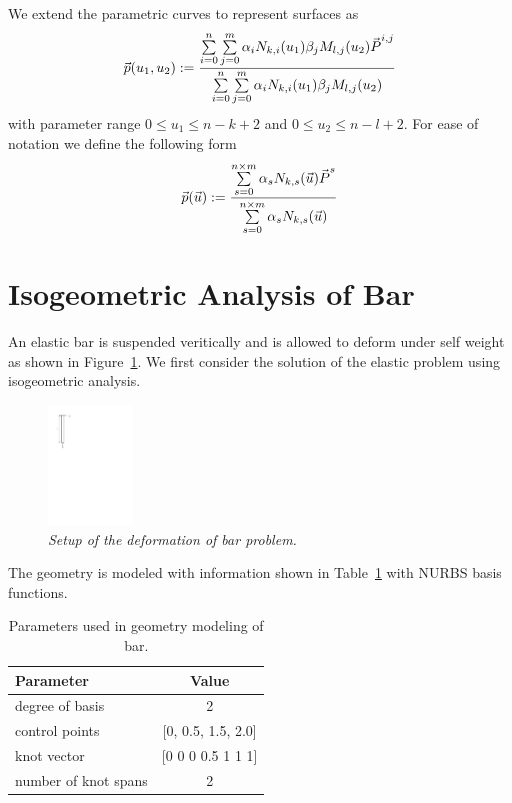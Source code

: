 \documentclass[submit,12pt]{aiaa-pretty} %
\begin{document}
We extend the parametric curves to represent surfaces as
\begin{equation}
  \vec{\mkern0mup}(u_1, u_2) := \dfrac{ {\sum\limits_{i=0}^{n} \sum\limits_{j=0}^{m} \alpha_i N_{k,i}(u_1) \beta_j M_{l,j}(u_2) \vec{\mkern0muP}^{i,j}}} {\sum\limits_{i=0}^{n} \sum\limits_{j=0}^{m} \alpha_i N_{k,i}(u_1) \beta_j M_{l,j}(u_2)}
\end{equation}
with parameter range $0 \le u_1 \le n - k + 2$ and $0 \le u_2 \le n - l + 2$. 
For ease of notation we define the following form
\begin{equation}
  \vec{\mkern0mup}(\vec{\mkern0muu}) := \dfrac{ {\sum \limits_{s=0}^{n \times m} \alpha_{s} N_{k,s}(\vec{\mkern0muu}) \vec{\mkern0muP}^{s}}} {\sum \limits_{s=0}^{n \times m} \alpha_{s} N_{k,s}(\vec{\mkern0muu})}
\end{equation}

\section{Isogeometric Analysis of Bar}
An elastic bar is suspended veritically and is allowed to deform under
self weight as shown in Figure~\ref{fig:bar-setup}. We first consider
the solution of the elastic problem using isogeometric analysis.\cite{1D_bar}
\begin{figure}[h] 
  \centering
  \includegraphics[width=0.2\textwidth]{bar-setup.pdf} 
  \caption{\emph{Setup of the deformation of bar problem.}}
  \label{fig:bar-setup}
\end{figure}
The geometry is modeled with information shown in
Table~\ref{tab:bar-problem-parameters} with NURBS basis functions.
\begin{table}
  \centering
  \caption{Parameters used in geometry modeling of bar.}
  \label{tab:bar-problem-parameters}
  \begin{tabular}{lc}
    \hline
    Parameter & Value \\
    \hline
    degree of basis & 2 \\
    control points  &  [0, 0.5, 1.5, 2.0] \\
    knot vector     & [0 0 0 0.5 1 1 1] \\
    number of knot spans & 2 \\
    \hline
  \end{tabular}
\end{table}
\end{document}
